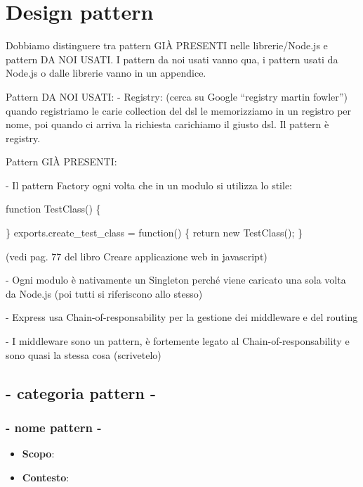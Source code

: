 \section{Design pattern}

Dobbiamo distinguere tra pattern GIÀ PRESENTI nelle librerie/Node.js e pattern DA NOI USATI. I pattern da noi usati vanno qua, i pattern usati da Node.js o dalle librerie vanno in un appendice.


Pattern DA NOI USATI:
- Registry: (cerca su Google ``registry martin fowler'') quando registriamo le carie collection del dsl le memorizziamo in un registro per nome, poi quando ci arriva la richiesta carichiamo il giusto dsl. Il pattern è registry.


Pattern GIÀ PRESENTI:

- Il pattern Factory ogni volta che in un modulo si utilizza lo stile:

function TestClass() \{

\}
exports.create\_test\_class = function() \{
	return new TestClass();
\}

(vedi pag. 77 del libro Creare applicazione web in javascript)

- Ogni modulo è nativamente un Singleton perché viene caricato una sola volta da Node.js (poi tutti si riferiscono allo stesso)

- Express usa Chain-of-responsability per la gestione dei middleware e del routing

- I middleware sono un pattern, è fortemente legato al Chain-of-responsability e sono quasi la stessa cosa (scrivetelo)

\subsection{ - categoria pattern - }

\subsubsection{ - nome pattern - }

\begin{itemize}

	\item \textbf{Scopo}:
	\item \textbf{Contesto}:

\end{itemize}